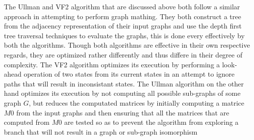  The Ullman and VF2 algorithm that are discussed above both follow a similar approach in attempting to perform graph mathing. They both construct a tree from the adjacency representation of their input graphs and use the depth first tree traversal techniques to evaluate the graphs, this is done every effectively by both the algorithms.\newline\newline
 Though both algorithms are effective in their own respective regards, they are optimized rather differently and thus differe in their degree of complexity. The VF2 algorithm optimizes its execution by performing a look-ahead operation of two states from its current states in an attempt to ignore paths that will result in inconsistant states.\newline\newline
 The Ullman algorithm on the other hand optimizes its execution by not computing all possible sub-graphs of some graph $G$, but reduces the computated matrices by initially computing a matrice $M0$ from the input graphs and then ensuring that all the matrices that are computed from $M0$ are tested so as to prevent the algorithm from exploring a branch that will not result in a graph or sub-graph isomorphism



